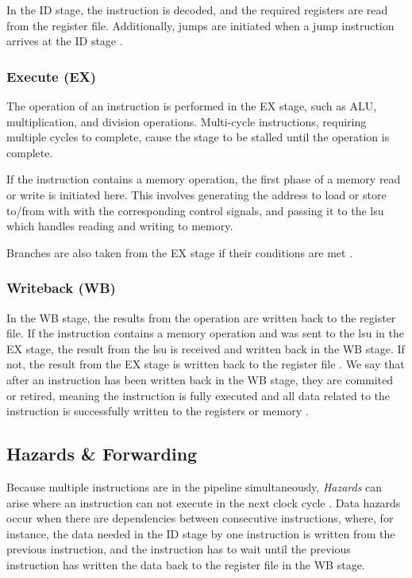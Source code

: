 In the ID stage, the instruction is decoded, and the required registers are read from the register file. Additionally, jumps are initiated when a jump instruction arrives at the ID stage \cite{openhwgroupPipelineDetailsCOREV2023}. 

\subsubsection{Execute (EX)}

The operation of an instruction is performed in the EX stage, such as ALU, multiplication, and division operations. Multi-cycle instructions, requiring multiple cycles to complete, cause the stage to be stalled until the operation is complete.

If the instruction contains a memory operation, the first phase of a memory read or write is initiated here. This involves generating the address to load or store to/from with with the corresponding control signals, and passing it to the \acrlong{lsu} which handles reading and writing to memory.

Branches are also taken from the EX stage if their conditions are met \cite{openhwgroupPipelineDetailsCOREV2023}.

\subsubsection{Writeback (WB)}

In the WB stage, the results from the operation are written back to the register file. 
If the instruction contains a memory operation and was sent to the \acrshort{lsu} in the EX stage, the result from the \acrshort{lsu} is received and written back in the WB stage. If not, the result from the EX stage is written back to the register file \cite{openhwgroupPipelineDetailsCOREV2023}.
We say that after an instruction has been written back in the WB stage, they are \gls{commited} or \gls{retired}, meaning the instruction is fully executed and all data related to the instruction is successfully written to the registers or memory \cite{taylorAdvancedRISCVVerification2023}. 


\subsection{Hazards \& Forwarding}

Because multiple instructions are in the pipeline simultaneously, \textit{Hazards} can arise where an instruction can not execute in the next clock cycle \cite{pattersonComputerOrganizationDesign2021}. Data hazards occur when there are dependencies between consecutive instructions, where, for instance, the data needed in the ID stage by one instruction is written from the previous instruction, and the instruction has to wait until the previous instruction has written the data back to the register file in the WB stage.

